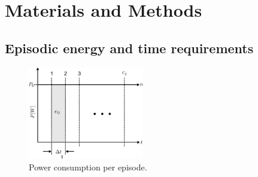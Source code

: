 \section{Materials and Methods}\label{sec:materials_and_methods}

\subsection{Episodic energy and time requirements}\label{sec:power_per_episode}
\begin{figure}[!h]
	\centering
	\includegraphics[width=0.45\textwidth]{fig/power_per_episode.png}
	\caption{Power consumption per episode.}
	\label{fig:power_per_episode}
\end{figure}
